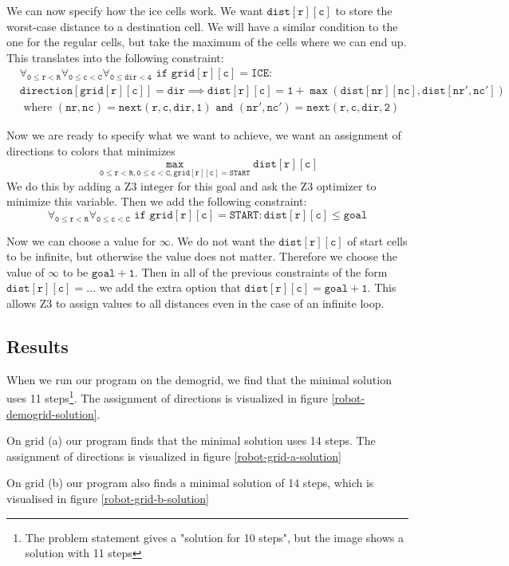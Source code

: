 \documentclass{scrartcl}
\begin{document}
	We can now specify how the ice cells work. We want $\mathtt{dist[r][c]}$ to store the worst-case distance to a destination cell. We will have a similar condition to the one for the regular cells, but take the maximum of the cells where we can end up. This translates into the following constraint:
	\begin{align*}
		&\mathtt{\forall_{0\le r<R}\forall_{0\le c<C}\forall_{0\le dir<4}\text{ if } grid[r][c] = ICE:}\\
		&\mathtt{direction[grid[r][c]]=dir \implies dist[r][c]=1+\max(dist[nr][nc],dist[nr',nc'])}\\
		&\text{ where }
		\mathtt{(nr,nc) = next(r,c,dir,1) \text{ and } (nr',nc') = next(r,c,dir,2)}
	\end{align*}

	Now we are ready to specify what we want to achieve, we want an assignment of directions to colors that minimizes
	$$\mathtt{\max_{0\le r < R, 0\le c < C, grid[r][c]=START} dist[r][c]}$$
	We do this by adding a Z3 integer for this goal and ask the Z3 optimizer to minimize this variable. Then we add the following constraint:
	$$\mathtt{\forall_{0\le r<R}\forall_{0\le c<C}\text{ if }grid[r][c]=START: dist[r][c]\le goal}$$

	Now we can choose a value for $\infty$. We do not want the $\mathtt{dist[r][c]}$ of start cells to be infinite, but otherwise the value does not matter. Therefore we choose the value of $\infty$ to be $\mathtt{goal+1}$. Then in all of the previous constraints of the form $\mathtt{dist[r][c]=\ldots}$ we add the extra option that $\mathtt{dist[r][c]=goal+1}$. This allows Z3 to assign values to all distances even in the case of an infinite loop.

	\subsection{Results} %
	\label{sub:results}
	When we run our program on the demogrid, we find that the minimal solution uses 11 steps\footnote{The problem statement gives a "solution for 10 steps", but the image shows a solution with 11 steps}. The assignment of directions is visualized in figure \ref{robot-demogrid-solution}.

	On grid (a) our program finds that the minimal solution uses 14 steps. The assignment of directions is visualized in figure \ref{robot-grid-a-solution}

	On grid (b) our program also finds a minimal solution of 14 steps, which is visualised in figure \ref{robot-grid-b-solution}
\end{document}
